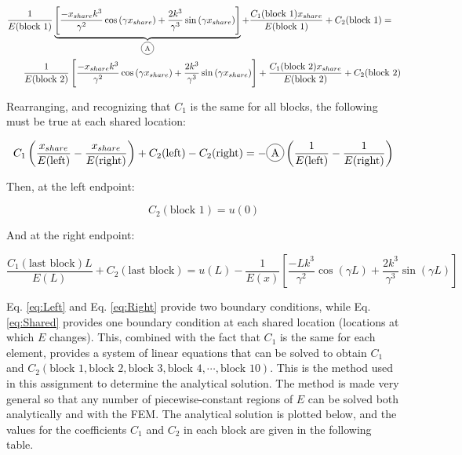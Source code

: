 \documentclass[10pt]{article}
\newcommand*\circled[1]{\tikz[baseline=(char.base)]{
            \node[shape=circle,draw,inner sep=2pt] (char) {#1};}}
\begin{document}
\begin{equation}
\begin{aligned}
\frac{1}{E(\text{block 1})}\underbrace{\left\lbrack\frac{-x_{share}k^3}{\gamma^2}\cos{(\gamma x_{share})}+\frac{2k^3}{\gamma^3}\sin{(\gamma x_{share})}\right\rbrack}_\text{\circled{A}}+\frac{C_1(\text{block 1})x_{share}}{E(\text{block 1})}+C_2(\text{block 1})=\quad\\
\frac{1}{E(\text{block 2})}\left\lbrack\frac{-x_{share}k^3}{\gamma^2}\cos{(\gamma x_{share})}+\frac{2k^3}{\gamma^3}\sin{(\gamma x_{share})}\right\rbrack+\frac{C_1(\text{block 2})x_{share}}{E(\text{block 2})}+C_2(\text{block 2})\\
\end{aligned}
\end{equation}

Rearranging, and recognizing that \(C_1\) is the same for all blocks, the following must be true at each shared location:

\begin{equation}
\begin{aligned}
\label{eq:Shared}
C_1\left(\frac{x_{share}}{E(\text{left})}-\frac{x_{share}}{E(\text{right})}\right)+C_2(\text{left})-C_2(\text{right})=-\circled{A}\left(\frac{1}{E(\text{left})}-\frac{1}{E(\text{right})}\right)
\end{aligned}
\end{equation}

Then, at the left endpoint:

\begin{equation}
\label{eq:Left}
C_2(\text{block 1})=u(0)
\end{equation}

And at the right endpoint:

\begin{equation}
\label{eq:Right}
\frac{C_1(\text{last block})L}{E(L)}+C_2(\text{last block})=u(L)-\frac{1}{E(x)}\left\lbrack\frac{-Lk^3}{\gamma^2}\cos{(\gamma L)}+\frac{2k^3}{\gamma^3}\sin{(\gamma L)}\right\rbrack
\end{equation}

Eq. \eqref{eq:Left} and Eq. \eqref{eq:Right} provide two boundary conditions, while Eq. \eqref{eq:Shared} provides one boundary condition at each shared location (locations at which \(E\) changes). This, combined with the fact that \(C_1\) is the same for each element, provides a system of linear equations that can be solved to obtain \(C_1\) and \(C_2(\text{block 1}, \text{block 2}, \text{block 3}, \text{block 4}, \cdots, \text{block 10})\). This is the method used in this assignment to determine the analytical solution. The method is made very general so that any number of piecewise-constant regions of \(E\) can be solved both analytically and with the FEM. The analytical solution is plotted below, and the values for the coefficients \(C_1\) and \(C_2\) in each block are given in the following table.
\end{document}
